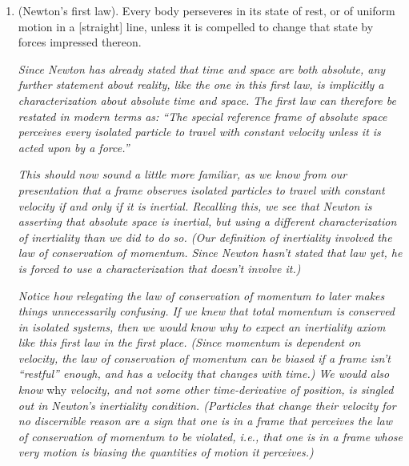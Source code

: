 \documentclass{article}
\begin{document}
\begin{enumerate}
	\textit{Here, Newton states the axiom of absolute space.}
	
	\textit{Newton also defines a notion of ``relative space'', which, in modern terminology, is a ``reference frame''. He asserts that the content making up the space in a reference frame is the same across all frames (``likewise in kind''), and that all reference frames have infinite extent and observe all phenomena in the universe (``likewise in magnitude''), even though reference frames don't ``always endure in the same position'' relative to absolute space. He reminds us that many frames which we may think of as being ``unmovable'', like that of a frame in the deep dark ``underground'', or a frame in the ``air'', or a frame in ``the heavens'', are actually all examples of relative space (reference frames), since they are stationary relative to the Earth as it moves through space.}
	
	\item (Newton's first law). Every body perseveres in its state of rest, or of uniform motion in a [straight] line, unless it is compelled to change that state by forces impressed thereon.
	
	\textit{Since Newton has already stated that time and space are both absolute, any further statement about reality, like the one in this first law, is implicitly a characterization about absolute time and space. The first law can therefore be restated in modern terms as: ``The special reference frame of absolute space perceives every isolated particle to travel with constant velocity unless it is acted upon by a force.''}
	
	\textit{This should now sound a little more familiar, as we know from our presentation that a frame observes isolated particles to travel with constant velocity if and only if it is inertial. Recalling this, we see that Newton is asserting that absolute space is inertial, but using a different characterization of inertiality than we did to do so. (Our definition of inertiality involved the law of conservation of momentum. Since Newton hasn't stated that law yet, he is forced to use a characterization that doesn't involve it.)}
	
	\textit{Notice how relegating the law of conservation of momentum to later makes things unnecessarily confusing. If we knew that total momentum is conserved in isolated systems, then we would know why to expect an inertiality axiom like this first law in the first place. (Since momentum is dependent on velocity, the law of conservation of momentum can be biased if a frame isn't ``restful'' enough, and has a velocity that changes with time.) We would also know } why \textit{velocity, and not some other time-derivative of position, is singled out in Newton's inertiality condition. (Particles that change their velocity for no discernible reason are a sign that one is in a frame that perceives the law of conservation of momentum to be violated, i.e., that one is in a frame whose very motion is biasing the quantities of motion it perceives.)}
	

\end{enumerate}
\end{document}
